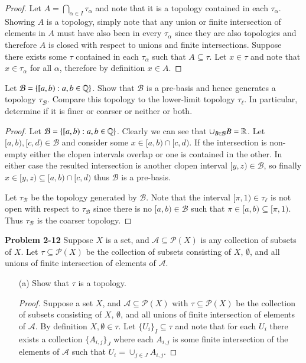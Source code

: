 \documentclass[minion]{homework651}
\def\calB{\mathcal{B}}
\begin{document}
\begin{problems}
\begin{proof}
    

        Let $A = \bigcap_{\alpha \in I} \tau_\alpha$ and note that it is a topology contained in each $\tau_\alpha$. Showing $A$ is a topology, simply note that any union or finite intersection of elements in $A$ must have also been in every $\tau_\alpha$ since they are also topologies and therefore $A$ is closed with respect to unions and finite intersections. Suppose there exists some $\tau$ contained in each $\tau_\alpha$ such that $A \subseteq \tau$. Let $x \in \tau$ and note that $x \in \tau_\alpha$ for all $\alpha$, therefore by definition $x \in A$. 

\end{proof}


\problem Let $\calB=\{[a,b):a,b\in \Rats\}$.  Show that $\calB$ 
is a pre-basis
and hence generates a topology $\tau_\calB$.  Compare this topology to the 
lower-limit topology $\tau_\ell$.  In particular, determine if it is finer or coarser
or neither or both.
\begin{proof} Let $\calB=\{[a,b):a,b\in \Rats\}$. Clearly we can see that $\cup_{B \in \calB} B = \RR$.
    Let $[a,b), [c, d) \in \calB$ and consider some $x \in [a,b) \cap [c, d)$. If the intersection is non-empty
    either the clopen intervals overlap or one is contained in the other. In either case the resulted intersection is 
    another clopen interval $[y, z) \in \calB$, so finally $x \in [y, z) \subseteq [a,b) \cap [c, d)$  thus $\calB$ is a pre-basis. 

    Let $\tau_\calB$ be the topology generated by $\calB$. Note that the interval $[\pi, 1) \in \tau_\ell$ is not 
    open with respect to $\tau_\calB$ since there is no $[a,b) \in \calB$ such that $\pi \in [a,b) \subseteq [\pi, 1)$. 
    Thus $\tau_\calB$ is the coarser topology. 
    
\end{proof}

\problem \textbf{Problem 2-12} Suppose $X$ is a set, and $\mathcal{A} \subseteq \mathcal{P}(X)$ is any collection 
of subsets of $X$. Let $\tau \subseteq \mathcal{P}(X)$ be the collection of subsets consisting of $X$, $\emptyset$, 
and all unions of finite intersection of elements of $\mathcal{A}$. 
\begin{enumerate}
    \item[(a)] Show that $\tau$ is a topology. 
    \begin{proof} Suppose a set $X$, and $\mathcal{A} \subseteq \mathcal{P}(X)$ with $\tau \subseteq \mathcal{P}(X)$ be the collection of subsets consisting of $X$, $\emptyset$, 
        and all unions of finite intersection of elements of $\mathcal{A}$. By definition $X, \emptyset \in \tau$. 
        Let $\{U_i\}_I \subseteq \tau$ and note that for each $U_i$ there exists a collection $\{A_{i,j}\}_{J}$ where each $A_{i,j}$ is some finite intersection of the elements of $\mathcal{A}$ such that $U_i = \cup_{j \in J}A_{i, j}$. 


\end{proof}
\end{enumerate}
\end{problems}
\end{document}
